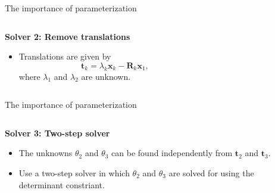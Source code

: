 \documentclass[aspectratio=169]{beamer}
\newcommand{\mat}[1]{\bm{#1}}
\begin{document}
\begin{frame}{The importance of parameterization}
\begin{columns}
    \begin{column}{0.5\textwidth}
        \textbf{Solver 2: Remove translations}

        \begin{itemize}
            \item Translations are given by
            \[
                \mat{t}_k = \lambda_k\mat{x}_k-\mat{R}_k\mat{x}_1,
            \]
            where $\lambda_1$ and $\lambda_2$ are unknown.
        \end{itemize}

    \end{column}%
    \begin{column}{0.5\textwidth}
        \centering
        
    \end{column}
\end{columns}
\end{frame}

\begin{frame}{The importance of parameterization}
\begin{columns}
    \begin{column}{0.5\textwidth}
        \textbf{Solver 3: Two-step solver}

        \begin{itemize}
        \item The unknowns $\theta_2$ and $\theta_3$ can be found independently from $\mat{t}_2$ and $\mat{t}_3$.
        \item Use a two-step solver in which $\theta_2$ and $\theta_3$ are solved for
        using the determinant constriant.
        \end{itemize}

    \end{column}%
    \begin{column}{0.5\textwidth}
        \centering
        
    \end{column}
\end{columns}
\end{frame}
\end{document}
